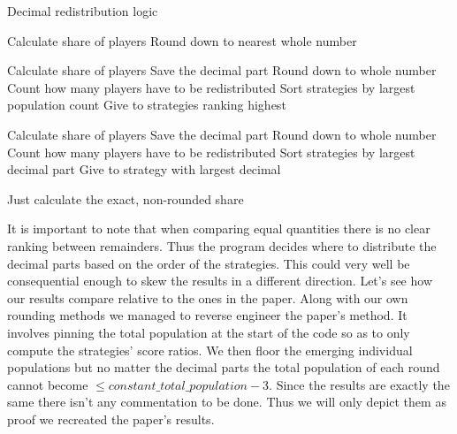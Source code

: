 \documentclass[12pt]{report}
\begin{document}
\begin{algorithm}
\caption{Decimal redistribution logic}
\begin{algorithmic}[1]
      \State Calculate share of players
      \State Round down to nearest whole number
  \EndFor
\EndIf

      \State Calculate share of players
      \State Save the decimal part
      \State Round down to whole number
  \EndFor
  \State Count how many players have to be redistributed
  \State Sort strategies by largest population count
    \State Give to strategies ranking highest
  \EndFor
\EndIf

      \State Calculate share of players
      \State Save the decimal part
      \State Round down to whole number
  \EndFor
  \State Count how many players have to be redistributed 
  \State Sort strategies by largest decimal part
    \State Give to strategy with largest decimal
  \EndFor
\EndIf

      \State Just calculate  the exact, non-rounded share
  \EndFor
\EndIf    
\end{algorithmic}
\end{algorithm}


It is important to note that when comparing equal quantities there is no clear ranking between remainders. Thus the program decides where to distribute the decimal parts based on the order of the strategies. This could very well be consequential enough to skew the results in a different direction. Let's see how our results compare relative to the ones in the paper. Along with our own rounding methods we managed to reverse engineer the paper's method. It involves pinning the total population at the start of the code so as to only compute the strategies' score ratios. We then floor the emerging individual populations but no matter the decimal parts the total population of each round cannot become 
    $\leq constant\_total\_population-3$. Since the results are exactly the same there isn't any commentation to be done. Thus we will only depict them as proof we recreated the paper's results.
\newpage

\end{document}
